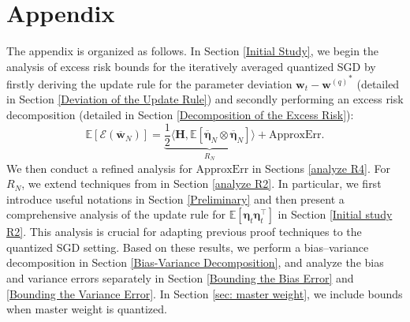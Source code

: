 \documentclass[11pt, letterpaper]{article}
\begin{document}


\newpage




\newpage
\appendix 

\section*{Appendix}
\tableofcontents
\resettocdepth{}
\newpage
The appendix is organized as follows. In Section \ref{Initial Study}, we begin the analysis of excess risk bounds for the iteratively averaged quantized SGD by firstly deriving the update rule for the parameter deviation $\mathbf{w}_t - {\mathbf{w}^{(q)}}^*$ (detailed in Section \ref{Deviation of the Update Rule}) and secondly performing an excess risk decomposition (detailed in Section \ref{Decomposition of the Excess Risk}):
\begin{equation*}
    \mathbb{E}[\mathcal{E}(\overline{\mathbf{w}}_N)]=\underbrace{\frac{1}{2}\langle\mathbf{H},\mathbb{E}[\overline{\boldsymbol{\eta}}_N\otimes\overline{\boldsymbol{\eta}}_N]\rangle}_{R_N}+\mathrm{ApproxErr}.
\end{equation*}
We then conduct a refined analysis for $\mathrm{ApproxErr}$ in Sections \ref{analyze R4}. 
For $R_N$, we extend techniques from \citet{zou2023benign} in Section \ref{analyze R2}. In particular, we first introduce useful notations in Section \ref{Preliminary} and then present a comprehensive analysis of the update rule for $\mathbb{E}[\boldsymbol{\eta}_t \boldsymbol{\eta}_t^\top]$ in Section \ref{Initial study R2}. This analysis is crucial for adapting previous proof techniques to the quantized SGD setting. Based on these results, we perform a bias–variance decomposition in Section \ref{Bias-Variance Decomposition}, and analyze the bias and variance errors separately in Section \ref{Bounding the Bias Error} and \ref{Bounding the Variance Error}. In Section \ref{sec: master weight}, we include bounds when master weight is quantized.
\end{document}
